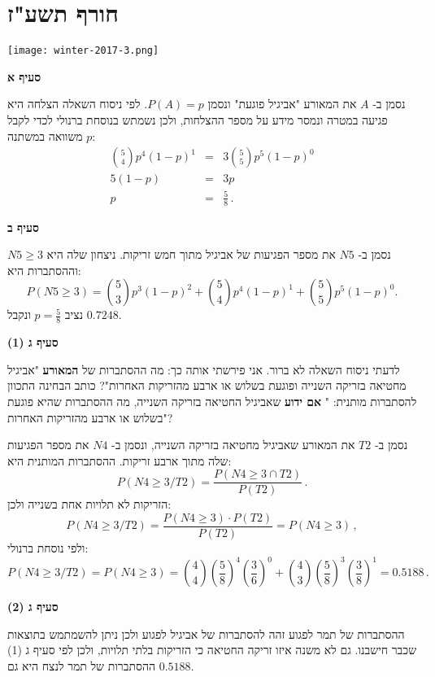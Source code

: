 \section{חורף תשע"ז}

\begin{center}
\texttt{[image: winter-2017-3.png]}
\end{center}

\textbf{סעיף א}

נסמן ב-%
$A$
את המאורע "אביגיל פוגעת" ונסמן
$P(A)=p$.
לפי ניסוח השאלה הצלחה היא פגיעה במטרה ונמסר מידע על מספר ההצלחות, ולכן נשמתש בנוסחת ברנולי לכדי לקבל משוואה במשתנה 
$p$:
\begin{eqnarray*}
{5 \choose 4} p^4(1-p)^1 &=& 3{5\choose 5}p^5(1-p)^0\\
5(1-p) &=& 3p\\
p&=&\frac{5}{8}\,.
\end{eqnarray*}

\textbf{סעיף ב}

נסמן ב-%
$N5$
את מספר הפגיעות של אביגיל מתוך חמש זריקות. ניצחון שלה היא 
$N5\geq 3$
וההסתברות היא:
\[
P(N5\geq 3)=
{5 \choose 3}p^3(1-p)^2 + {5 \choose 4}p^4(1-p)^1 + {5 \choose 5}p^5(1-p)^0.
\]
נציב
$p=\displaystyle\frac{5}{8}$
ונקבל
$0.7248$.

\textbf{סעיף ג (1)}

לדעתי ניסוח השאלה לא ברור. אני פירשתי אותה כך: מה ההסתברות של
\textbf{המאורע}
"אביגיל מחטיאה בזריקה השנייה ופוגעת בשלוש או ארבע מהזריקות האחרות"? כותב הבחינה התכוון להסתברות מותנית: "%
\textbf{אם ידוע}
שאביגיל החטיאה בזריקה השנייה, מה ההסתברות שהיא פוגעת בשלוש או ארבע מהזריקות האחרות"?

נסמן ב-%
$T2$
את המאורע שאביגיל מחטיאה בזריקה השנייה, ונסמן ב-%
$N4$
את מספר הפגיעות שלה מתוך ארבע זריקות. ההסתברות המותנית היא:
\[
P(N4\geq 3/T2) = \frac{P(N4\geq 3\cap T2)}{P(T2)}\,.
\]
הזריקות לא תלויות אחת בשנייה ולכן:
\[
P(N4\geq 3/T2) = \frac{P(N4\geq 3)\cdot P(T2)}{P(T2)}=P(N4\geq 3)\,,
\]
ולפי נוסחת ברנולי:
\[
P(N4\geq 3/T2) =P(N4\geq 3)=
{4\choose 4}\left(\frac{5}{8}\right)^4 \left(\frac{3}{6}\right)^0 +{4\choose 3}\left(\frac{5}{8}\right)^3\left(\frac{3}{8}\right)^1 = 0.5188\,.
\]

\textbf{סעיף ג (2)}

ההסתברות של תמר לפגוע זהה להסתברות של אביגיל לפגוע ולכן ניתן להשמתמש בתוצאות שכבר חישבנו. גם לא משנה איזו זריקה החטיאה כי הזריקות בלתי תלויות, ולכן לפי סעיף ג (1) ההסתברות של תמר לנצח היא גם
$0.5188$.

